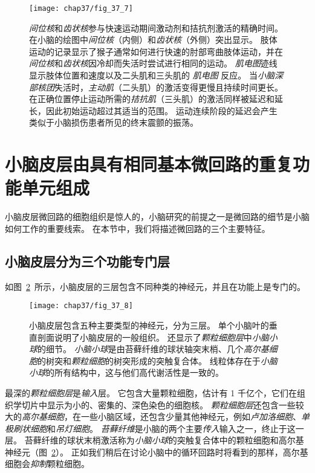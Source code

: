 \begin{figure}[htbp]
	\centering
	\texttt{[image: chap37/fig\_37\_7]}
	\caption{\textit{间位核}和\textit{齿状核}参与快速运动期间激动剂和拮抗剂激活的精确时间。
		在小脑的绘图中\textit{间位核}（内侧）和\textit{齿状核}（外侧）突出显示。
		肢体运动的记录显示了猴子通常如何进行快速的肘部弯曲肢体运动，并在\textit{间位核}和\textit{齿状核}因冷却而失活时尝试进行相同的运动。
		\textit{肌电图}迹线显示肢体位置和速度以及二头肌和三头肌的 \textit{肌电图} 反应。
		当\textit{小脑深部核团}失活时，\textit{主动肌}（二头肌）的激活变得更慢且持续时间更长。
		在正确位置停止运动所需的\textit{拮抗肌}（三头肌）的激活同样被延迟和延长，因此初始运动超过其适当的范围。
		运动连续阶段的延迟会产生类似于小脑损伤患者所见的终末震颤的振荡。}
	\label{fig:37_7}
\end{figure}




\section{小脑皮层由具有相同基本微回路的重复功能单元组成}

小脑皮层微回路的细胞组织是惊人的，小脑研究的前提之一是微回路的细节是小脑如何工作的重要线索。
在本节中，我们将描述微回路的三个主要特征。


\subsection{小脑皮层分为三个功能专门层}

如图~\ref{fig:37_8}~所示，小脑皮层的三层包含不同种类的神经元，并且在功能上是专门的。


\begin{figure}[htbp]
	\centering
	\texttt{[image: chap37/fig\_37\_8]}
	\caption{小脑皮层包含五种主要类型的神经元，分为三层。
		单个小脑叶的垂直剖面说明了小脑皮层的一般组织。
		还显示了\textit{颗粒细胞层}中\textit{小脑小球}的细节。
		\textit{小脑小球}是由苔藓纤维的球状轴突末梢、几个\textit{高尔基细胞}的树突和\textit{颗粒细胞}的树突形成的突触复合体。
		线粒体存在于\textit{小脑小球}的所有结构中，这与他们高代谢活性是一致的。}
	\label{fig:37_8}
\end{figure}


最深的\textit{颗粒细胞层}是\textit{输入}层。
它包含大量颗粒细胞，估计有 1 千亿个，它们在组织学切片中显示为小的、密集的、深色染色的细胞核。
\textit{颗粒细胞层}还包含一些较大的\textit{高尔基细胞}，在一些小脑区域，还包含少量其他神经元，例如\textit{卢加洛细胞}、\textit{单极刷状细胞}和\textit{吊灯细胞}。
\textit{苔藓纤维}是小脑的两个主要\textit{传入}输入之一，终止于这一层。
苔藓纤维的球状末梢激活称为\textit{小脑小球}的突触复合体中的颗粒细胞和高尔基神经元（图~\ref{fig:37_8}）。
正如我们稍后在讨论小脑中的循环回路时将看到的那样，高尔基细胞会\textit{抑制}颗粒细胞。


